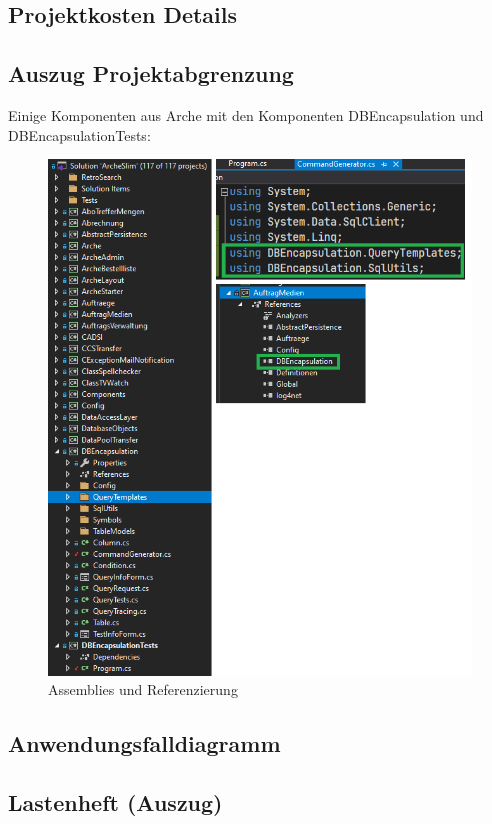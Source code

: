 \documentclass[11pt,toc=sectionentrywithoutdots, 
headheight=44pt, headings=optiontoheadandtoc, hyperfootnotes=false, hypertexnames=false]{scrartcl}
\begin{document}
\subsection{Projektkosten Details}
\blindtext\blindtext

\subsection{Auszug Projektabgrenzung}
 \label{fig:Assemblies}
Einige Komponenten aus Arche mit den Komponenten DBEncapsulation und DBEncapsulationTests:
 \begin{figure}[htp]
 \centering

	\includegraphics[scale=0.7]{Assemblies.png}
	 \caption{Assemblies und Referenzierung}
 \end{figure}
 \clearpage

\subsection{Anwendungsfalldiagramm}
\blindtext\blindtext

\subsection{Lastenheft (Auszug)}
\blindtext\blindtext
\end{document}
